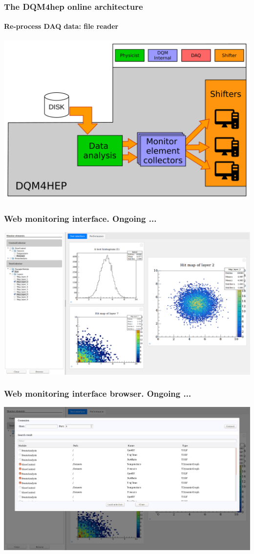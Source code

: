 \documentclass[presentation, 10pt]{beamer}
\begin{document}
\begin{frame}
  \frametitle{The DQM4hep online architecture}
  \framesubtitle{Re-process DAQ data: file reader}
  \includegraphics[width=0.95\linewidth]{figs/FileReaderModuleArchitecture.pdf}
\end{frame}

\begin{frame}
  \frametitle{Web monitoring interface. Ongoing ...}
  \includegraphics[width=\linewidth]{figs/ScreenshotWebMonitoring.png}
\end{frame}

\begin{frame}
  \frametitle{Web monitoring interface browser. Ongoing ...}
  \includegraphics[width=\linewidth]{figs/ScreenshotWebMonitoringBrowser.png}
\end{frame}
\end{document}
